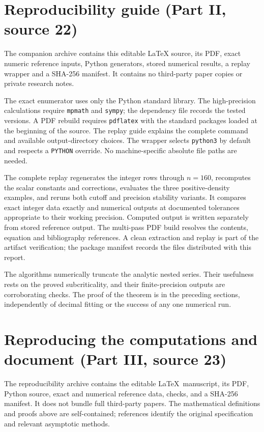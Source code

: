 \documentclass[11pt,letterpaper]{article}
\numberwithin{equation}{section}
\theoremstyle{definition}\newtheorem{definition}[theorem]{Definition}
\theoremstyle{remark}\newtheorem{remark}[theorem]{Remark}
\begin{document}
\appendix
\section{Reproducibility guide (Part II, source 22)}\label{gal:dn:app:replay}
The companion archive contains this editable \LaTeX{} source, its PDF, exact numeric reference inputs, Python generators, stored numerical results, a replay wrapper and a SHA-256 manifest. It contains no third-party paper copies or private research notes.

The exact enumerator uses only the Python standard library. The high-precision calculations require \texttt{mpmath} and \texttt{sympy}; the dependency file records the tested versions. A PDF rebuild requires \texttt{pdflatex} with the standard packages loaded at the beginning of the source. The replay guide explains the complete command and available output-directory choices. The wrapper selects \texttt{python3} by default and respects a \texttt{PYTHON} override. No machine-specific absolute file paths are needed.

The complete replay regenerates the integer rows through $n=160$, recomputes the scalar constants and corrections, evaluates the three positive-density examples, and reruns both cutoff and precision stability variants. It compares exact integer data exactly and numerical outputs at documented tolerances appropriate to their working precision. Computed output is written separately from stored reference output. The multi-pass PDF build resolves the contents, equation and bibliography references. A clean extraction and replay is part of the artifact verification; the package manifest records the files distributed with this report.

The algorithms numerically truncate the analytic nested series. Their usefulness rests on the proved subcriticality, and their finite-precision outputs are corroborating checks. The proof of the theorem is in the preceding sections, independently of decimal fitting or the success of any one numerical run.
\section{Reproducing the computations and document (Part III, source 23)}\label{gal:ep:sec:reproduction}
The reproducibility archive contains the editable \LaTeX\ manuscript, its PDF, Python source, exact and numerical reference data, checks, and a SHA-256 manifest. It does not bundle full third-party papers. The mathematical definitions and proofs above are self-contained; references identify the original specification and relevant asymptotic methods.
\end{document}
